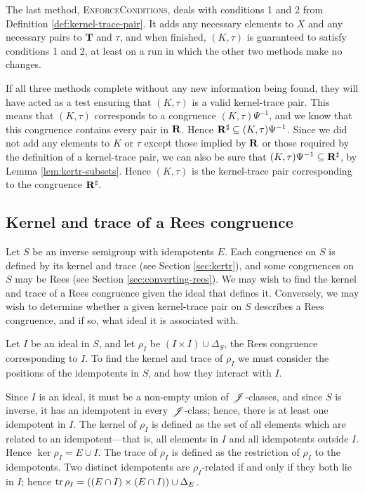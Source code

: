 The last method, \textsc{EnforceConditions}, deals with conditions 1 and 2 from
Definition \ref{def:kernel-trace-pair}.  It adds any necessary elements to $X$
and any necessary pairs to $\mathbf{T}$ and $\tau$, and when finished,
$(K,\tau)$ is guaranteed to satisfy conditions 1 and 2, at least on a run in
which the other two methods make no changes.

If all three methods complete without any new information being found, they will
have acted as a test ensuring that $(K, \tau)$ is a valid kernel-trace pair.
This means that $(K, \tau)$ corresponds to a congruence $(K,\tau)\Psi^{-1}$, and
we know that this congruence contains every pair in $\mathbf{R}$.  Hence
$\mathbf{R}^\sharp \subseteq (K,\tau)\Psi^{-1}$.  Since we did not add any
elements to $K$ or $\tau$ except those implied by $\mathbf{R}$ or those required
by the definition of a kernel-trace pair, we can also be sure that
$(K, \tau)\Psi^{-1} \subseteq \mathbf{R}^\sharp$, by Lemma
\ref{lem:kertr-subsets}.  Hence $(K, \tau)$ is the kernel-trace pair
corresponding to the congruence $\mathbf{R}^\sharp$.

\subsection{Kernel and trace of a Rees congruence}
\label{sec:rees-to-kertr}
Let $S$ be an inverse semigroup with idempotents $E$.  Each congruence on $S$ is
defined by its kernel and trace (see Section \ref{sec:kertr}), and some
congruences on $S$ may be Rees (see Section \ref{sec:converting-rees}).  We may wish
to find the kernel and trace of a Rees congruence given the ideal that defines
it.  Conversely, we may wish to determine whether a given kernel-trace pair on
$S$ describes a Rees congruence, and if so, what ideal it is associated with.

Let $I$ be an ideal in $S$, and let $\rho_I$ be $(I \times I) \cup \Delta_S$,
the Rees congruence corresponding to $I$.  To find the kernel and trace of
$\rho_I$ we must consider the positions of the idempotents in $S$, and how they
interact with $I$.

Since $I$ is an ideal, it must be a non-empty union of $\mathrel{\mathscr{J}}$-classes, and since $S$ is
inverse, it has an idempotent in every $\mathrel{\mathscr{J}}$-class; hence, there is at least one
idempotent in $I$.  The kernel of $\rho_I$ is defined as the set of all elements
which are related to an idempotent---that is, all elements in $I$ and all
idempotents outside $I$.  Hence $\ker \rho_I = E \cup I$.  The trace of $\rho_I$
is defined as the restriction of $\rho_I$ to the idempotents.  Two distinct
idempotents are $\rho_I$-related if and only if they both lie in $I$; hence
$\operatorname{tr} \rho_I = \left((E \cap I) \times (E \cap I)\right) \cup \Delta_E$.

